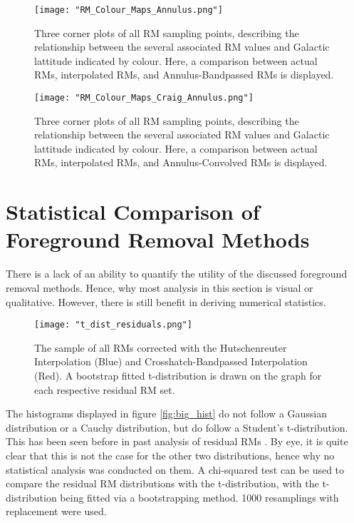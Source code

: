 \begin{figure}
    \texttt{[image: "RM\_Colour\_Maps\_Annulus.png"]}
    \centering
    \caption{Three corner plots of all RM sampling points, describing the relationship between the several associated RM values and Galactic lattitude indicated by colour. Here, a comparison between actual RMs, interpolated RMs, and Annulus-Bandpassed RMs is displayed.}
    \label{fig:colour_maps_2}
\end{figure}

\begin{figure}
    \texttt{[image: "RM\_Colour\_Maps\_Craig\_Annulus.png"]}
    \centering
    \caption{Three corner plots of all RM sampling points, describing the relationship between the several associated RM values and Galactic lattitude indicated by colour. Here, a comparison between actual RMs, interpolated RMs, and Annulus-Convolved RMs is displayed.}
    \label{fig:colour_maps_3}
\end{figure}


\section{Statistical Comparison of Foreground Removal Methods}
\label{sec:FR_stats}

There is a lack of an ability to quantify the utility of the discussed foreground removal methods. Hence, why most analysis in this section is visual or qualitative. However, there is still benefit in deriving numerical statistics.

\begin{figure}
    \texttt{[image: "t\_dist\_residuals.png"]}
    \centering
    \caption{The sample of all RMs corrected with the Hutschenreuter Interpolation (Blue) and Crosshatch-Bandpassed Interpolation (Red). A bootstrap fitted t-distribution is drawn on the graph for each respective residual RM set.}
    \label{fig:t_dist}
\end{figure}

The histograms displayed in figure \ref{fig:big_hist} do not follow a Gaussian distribution or a Cauchy distribution, but do follow a Student's t-distribution. This has been seen before in past analysis of residual RMs \citep{ID73}. By eye, it is quite clear that this is not the case for the other two distributions, hence why no statistical analysis was conducted on them. A chi-squared test can be used to compare the residual RM distributions with the t-distribution, with the t-distribution being fitted via a bootstrapping method. 1000 resamplings with replacement were used.

